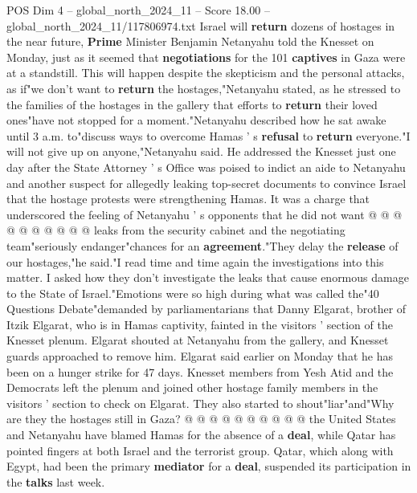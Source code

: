 \begin{textsample}{POS Dim 4 – global\_north\_2024\_11 – Score 18.00 – global\_north\_2024\_11/117806974.txt}  \label{ex:f4_pos_296}
Israel will \textbf{return} dozens of hostages in the near future, \textbf{Prime} Minister Benjamin Netanyahu told the Knesset on Monday, just as it seemed that \textbf{negotiations} for the 101 \textbf{captives} in Gaza were at a standstill.
This will happen despite the skepticism and the personal attacks, as if"we don't want to \textbf{return} the hostages,"Netanyahu stated, as he stressed to the families of the hostages in the gallery that efforts to \textbf{return} their loved ones"have not stopped for a moment."Netanyahu described how he sat awake until 3 a.m. to"discuss ways to overcome Hamas ' s \textbf{refusal} to \textbf{return} everyone."I will not give up on anyone,"Netanyahu said.
He addressed the Knesset just one day after the State Attorney ' s Office was poised to indict an aide to Netanyahu and another suspect for allegedly leaking top-secret documents to convince Israel that the hostage protests were strengthening Hamas.
It was a charge that underscored the feeling of Netanyahu ' s opponents that he did not want @ @ @ @ @ @ @ @ @ @ leaks from the security cabinet and the negotiating team"seriously endanger"chances for an \textbf{agreement}."They delay the \textbf{release} of our hostages,"he said."I read time and time again the investigations into this matter.
I asked how they don't investigate the leaks that cause enormous damage to the State of Israel."Emotions were so high during what was called the"40 Questions Debate"demanded by parliamentarians that Danny Elgarat, brother of Itzik Elgarat, who is in Hamas captivity, fainted in the visitors ' section of the Knesset plenum.
Elgarat shouted at Netanyahu from the gallery, and Knesset guards approached to remove him.
Elgarat said earlier on Monday that he has been on a hunger strike for 47 days.
Knesset members from Yesh Atid and the Democrats left the plenum and joined other hostage family members in the visitors ' section to check on Elgarat.
They also started to shout"liar"and"Why are they the hostages still in Gaza? @ @ @ @ @ @ @ @ @ @ the United States and Netanyahu have blamed Hamas for the absence of a \textbf{deal}, while Qatar has pointed fingers at both Israel and the terrorist group.
Qatar, which along with Egypt, had been the primary \textbf{mediator} for a \textbf{deal}, suspended its participation in the \textbf{talks} last week.

\end{textsample}
